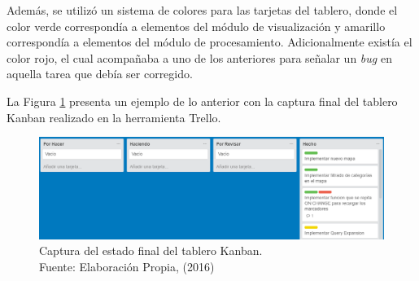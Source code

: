 Además, se utilizó un sistema de colores para las tarjetas del tablero, donde el color verde correspondía a elementos del módulo de visualización y amarillo correspondía a elementos del módulo de procesamiento. Adicionalmente existía el color rojo, el cual acompañaba a uno de los anteriores para señalar un \textit{bug} en aquella tarea que debía ser corregido. 

La Figura \ref{fig:trello} presenta un ejemplo de lo anterior con la captura final del tablero Kanban realizado en la herramienta Trello.

\begin{figure}[H]
	\centering
	\captionsetup{justification=centering}
	\includegraphics[scale=0.5]{images/Trello.png}
	\caption[Captura del estado final del tablero Kanban.]{Captura del estado final del tablero Kanban.\\Fuente: Elaboración Propia, (2016)}
	\label{fig:trello}
\end{figure}